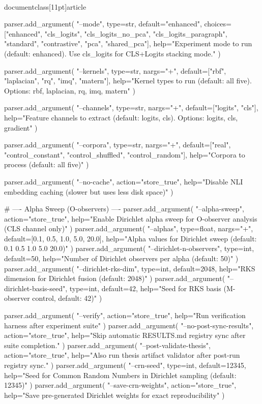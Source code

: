 \\documentclass[11pt]{article}
\begin{document}
\begin{CodeBlock}
    parser.add_argument(
        "--mode",
        type=str,
        default="enhanced",
        choices=["enhanced", "cls_logits", "cls_logits_no_pca", "cls_logits_paragraph", 
                 "standard", "contrastive", "pca", "shared_pca"],
        help="Experiment mode to run (default: enhanced). Use cls_logits for CLS+Logits stacking mode."
    )
    
    parser.add_argument(
        "--kernels",
        type=str,
        nargs="+",
        default=["rbf", "laplacian", "rq", "imq", "matern"],
        help="Kernel types to run (default: all five). Options: rbf, laplacian, rq, imq, matern"
    )
    
    parser.add_argument(
        "--channels",
        type=str,
        nargs="+",
        default=["logits", "cls"],
        help="Feature channels to extract (default: logits, cls). Options: logits, cls, gradient"
    )
    
    parser.add_argument(
        "--corpora",
        type=str,
        nargs="+",
        default=["real", "control_constant", "control_shuffled", "control_random"],
        help="Corpora to process (default: all five)"
    )
    
    parser.add_argument(
        "--no-cache",
        action="store_true",
        help="Disable NLI embedding caching (slower but uses less disk space)"
    )
    
    # ---- Alpha Sweep (O-observers) ----
    parser.add_argument(
        "--alpha-sweep",
        action="store_true",
        help="Enable Dirichlet alpha sweep for O-observer analysis (CLS channel only)"
    )
    parser.add_argument(
        "--alphas",
        type=float,
        nargs="+",
        default=[0.1, 0.5, 1.0, 5.0, 20.0],
        help="Alpha values for Dirichlet sweep (default: 0.1 0.5 1.0 5.0 20.0)"
    )
    parser.add_argument(
        "--dirichlet-n-observers",
        type=int,
        default=50,
        help="Number of Dirichlet observers per alpha (default: 50)"
    )
    parser.add_argument(
        "--dirichlet-rks-dim",
        type=int,
        default=2048,
        help="RKS dimension for Dirichlet fusion (default: 2048)"
    )
    parser.add_argument(
        "--dirichlet-basis-seed",
        type=int,
        default=42,
        help="Seed for RKS basis (M-observer control, default: 42)"
    )

    parser.add_argument(
        "--verify",
        action="store_true",
        help="Run verification harness after experiment suite"
    )
    parser.add_argument(
        "--no-post-sync-results",
        action="store_true",
        help="Skip automatic RESULTS.md registry sync after suite completion."
    )
    parser.add_argument(
        "--post-validate-thesis",
        action="store_true",
        help="Also run thesis artifact validator after post-run registry sync."
    )
    parser.add_argument(
        "--crn-seed",
        type=int,
        default=12345,
        help="Seed for Common Random Numbers in Dirichlet sampling (default: 12345)"
    )
    parser.add_argument(
        "--save-crn-weights",
        action="store_true",
        help="Save pre-generated Dirichlet weights for exact reproducibility"
    )
    

\end{CodeBlock}
\end{document}
